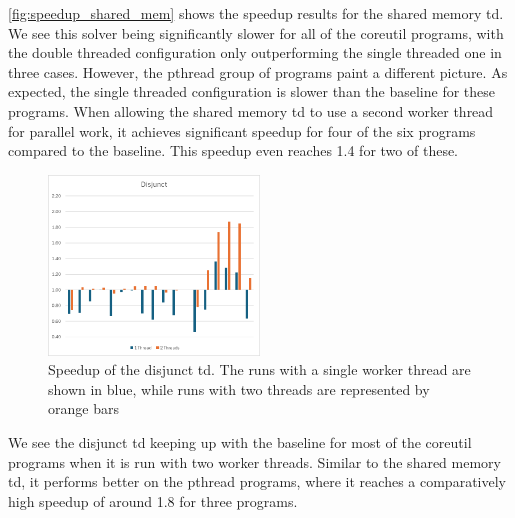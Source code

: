   \autoref{fig:speedup_shared_mem} shows the speedup results for the shared memory \ac{td}. We see this solver being significantly slower for all of the coreutil programs, with the double threaded configuration only outperforming the single threaded one in three cases. However, the pthread group of programs paint a different picture. As expected, the single threaded configuration is slower than the baseline for these programs. When allowing the shared memory \ac{td} to use a second worker thread for parallel work, it achieves significant speedup for four of the six programs compared to the baseline. This speedup even reaches 1.4 for two of these.

  \begin{figure}
    \includegraphics[width=0.5\textwidth]{../resources/Disjunct_draft.png}
    \caption[Speedup of the disjunct \ac{td}]{Speedup of the disjunct \ac{td}. The runs with a single worker thread are shown in blue, while runs with two threads are represented by orange bars}
    \label{fig:speedup_disjunct}
  \end{figure}

  We see the disjunct \ac{td} keeping up with the baseline for most of the coreutil programs when it is run with two worker threads. Similar to the shared memory \ac{td}, it performs better on the pthread programs, where it reaches a comparatively high speedup of around 1.8 for three programs.

